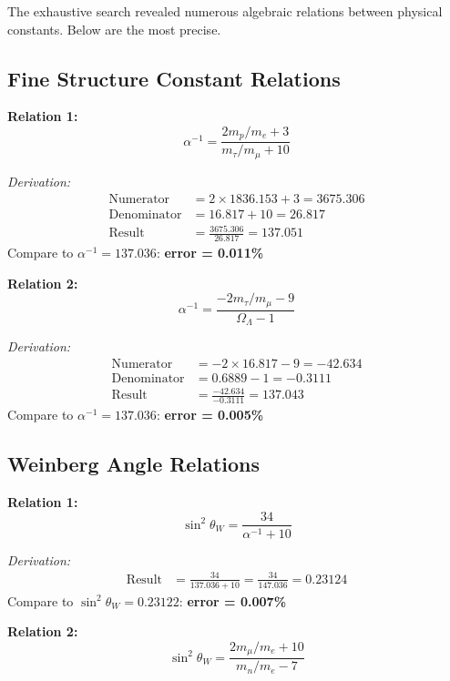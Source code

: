 \documentclass[11pt,a4paper]{article}
\begin{document}
The exhaustive search revealed numerous algebraic relations between physical constants. Below are the most precise.

\subsection{Fine Structure Constant Relations}

\textbf{Relation 1:}
\begin{equation}
\alpha^{-1} = \frac{2 m_p/m_e + 3}{m_\tau/m_\mu + 10}
\end{equation}

\textit{Derivation:}
\begin{align}
\text{Numerator} &= 2 \times 1836.153 + 3 = 3675.306 \\
\text{Denominator} &= 16.817 + 10 = 26.817 \\
\text{Result} &= \frac{3675.306}{26.817} = 137.051
\end{align}
Compare to $\alpha^{-1} = 137.036$: \textbf{error = 0.011\%}

\textbf{Relation 2:}
\begin{equation}
\alpha^{-1} = \frac{-2 m_\tau/m_\mu - 9}{\Omega_\Lambda - 1}
\end{equation}

\textit{Derivation:}
\begin{align}
\text{Numerator} &= -2 \times 16.817 - 9 = -42.634 \\
\text{Denominator} &= 0.6889 - 1 = -0.3111 \\
\text{Result} &= \frac{-42.634}{-0.3111} = 137.043
\end{align}
Compare to $\alpha^{-1} = 137.036$: \textbf{error = 0.005\%}

\subsection{Weinberg Angle Relations}

\textbf{Relation 1:}
\begin{equation}
\sin^2\theta_W = \frac{34}{\alpha^{-1} + 10}
\end{equation}

\textit{Derivation:}
\begin{align}
\text{Result} &= \frac{34}{137.036 + 10} = \frac{34}{147.036} = 0.23124
\end{align}
Compare to $\sin^2\theta_W = 0.23122$: \textbf{error = 0.007\%}

\textbf{Relation 2:}
\begin{equation}
\sin^2\theta_W = \frac{2 m_\mu/m_e + 10}{m_n/m_e - 7}
\end{equation}
\end{document}
